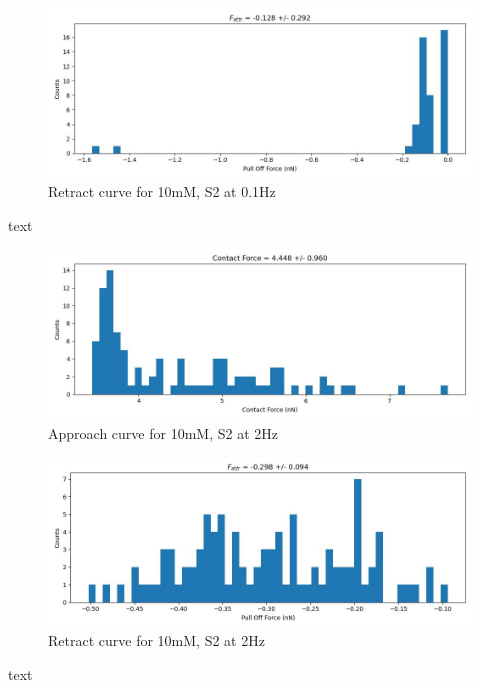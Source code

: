\begin{figure}[h!]
\centering
\includegraphics[width=\textwidth]{chapter7/Tip speed/10mM/S2 0.1Hz/retract_f_a_hist.jpg}
\caption{Retract curve for 10mM, S2 at 0.1Hz}
\end{figure}
text
\newpage

\begin{figure}[h!]
\centering
\includegraphics[width=\textwidth]{chapter7/Tip speed/10mM/S2 2Hz/approach_f_c_hist.jpg}
\caption{Approach curve for 10mM, S2 at 2Hz}
\end{figure}

\begin{figure}[h!]
\centering
\includegraphics[width=\textwidth]{chapter7/Tip speed/10mM/S2 2Hz/retract_f_a_hist.jpg}
\caption{Retract curve for 10mM, S2 at 2Hz}
\end{figure}
text
\newpage


